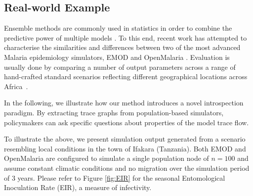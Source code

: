\documentclass{article}
\newcommand{\bg}[1]{~{{[{\it \textcolor{red}{{\bf BG:} #1}}]}}}
\begin{document}
\subsection{Real-world Example}
\label{sec:casestudy}

Ensemble methods are commonly used in statistics in order to combine the predictive power of multiple models \cite{cameron2015defining,smith_ensemble_2012}. To this end, recent work has attempted to characterise the similarities and differences between two of the most advanced Malaria epidemiology simulators, EMOD \cite{bershteyn2018implementation} and OpenMalaria \cite{smith2008towards}. Evaluation is usually done by comparing a number of output parameters across a range of hand-crafted standard scenarios reflecting different geographical locations across Africa~\cite{smith_ensemble_2012}.

In the following, we illustrate how our method introduces a novel introspection paradigm. By extracting trace graphs from population-based simulators, policymakers can ask specific questions about properties of the model trace flow. 

To illustrate the above, we present simulation output generated from a scenario resembling local conditions in the town of Ifakara (Tanzania). Both EMOD and OpenMalaria are configured to simulate a single population node of $n=100$ and assume constant climatic conditions and no migration over the simulation period of $3$ years. Please refer to Figure \ref{fig:EIR} for the seasonal Entomological Inoculation Rate (EIR), a measure of infectivity.
\end{document}
